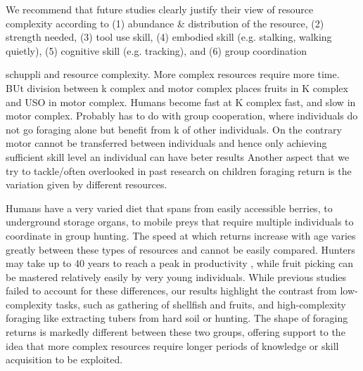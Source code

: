 

We recommend that future studies clearly justify their view of resource complexity according to (1) abundance & distribution of the resource, (2) strength needed, (3) tool use skill, (4) embodied skill (e.g. stalking, walking quietly), (5) cognitive skill (e.g. tracking), and (6) group coordination


schuppli and resource complexity. More complex resources require more time. BUt division between k complex and motor complex places fruits in K complex and USO in motor complex. Humans become fast at K complex fast, and slow in motor complex. Probably has to do with group cooperation, where individuals do not go foraging alone but benefit from k of other individuals. On the contrary motor cannot be transferred between individuals and hence only achieving sufficient skill level an individual can have beter results
Another aspect that we try to tackle/often overlooked in past research on children foraging return is the variation given by different resources. 

Humans have a very varied diet that spans from easily accessible berries, to underground storage organs, to mobile preys that require multiple individuals to coordinate in group hunting. The speed at which returns increase with age varies greatly between these types of resources and cannot be easily compared. Hunters may take up to 40 years to reach a peak in productivity \citep{koster_life_2020}, while fruit picking can be mastered relatively easily by very young individuals. While previous studies failed to account for these differences, our results highlight the contrast from low-complexity tasks, such as gathering of shellfish and fruits, and high-complexity foraging like extracting tubers from hard soil or hunting. The shape of foraging returns is markedly different between these two groups, offering support to the idea that more complex resources require longer periods of knowledge or skill acquisition to be exploited. 

